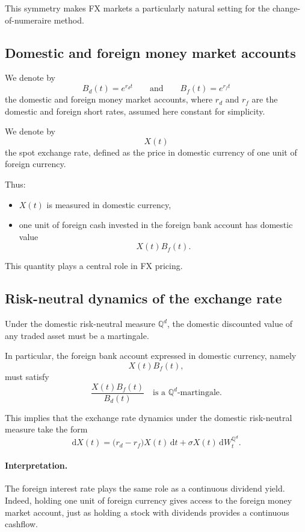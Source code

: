 \documentclass[11pt]{article}
\newcommand{\Qbb}{\mathbb{Q}}
\theoremstyle{definition}
\theoremstyle{plain}
\begin{document}
This symmetry makes FX markets a particularly natural setting for the
change-of-numeraire method.

\subsection{Domestic and foreign money market accounts}

We denote by
\[
B_d(t)=e^{r_d t}
\qquad\text{and}\qquad
B_f(t)=e^{r_f t}
\]
the domestic and foreign money market accounts, where \(r_d\) and \(r_f\)
are the domestic and foreign short rates, assumed here constant for
simplicity.

We denote by
\[
X(t)
\]
the spot exchange rate, defined as the price in domestic currency of one
unit of foreign currency.

Thus:
\begin{itemize}[leftmargin=1.4em]
\item \(X(t)\) is measured in domestic currency,
\item one unit of foreign cash invested in the foreign bank account has
domestic value
\[
X(t)B_f(t).
\]
\end{itemize}

This quantity plays a central role in FX pricing.

\subsection{Risk-neutral dynamics of the exchange rate}

Under the domestic risk-neutral measure \(\Qbb^d\), the domestic
discounted value of any traded asset must be a martingale.

In particular, the foreign bank account expressed in domestic currency,
namely
\[
X(t)B_f(t),
\]
must satisfy
\[
\frac{X(t)B_f(t)}{B_d(t)}
\quad\text{is a }\Qbb^d\text{-martingale.}
\]

This implies that the exchange rate dynamics under the domestic
risk-neutral measure take the form
\[
\boxed{
\mathrm{d}X(t)=\big(r_d-r_f\big)X(t)\,\mathrm{d}t+\sigma X(t)\,\mathrm{d}W_t^{\Qbb^d}.
}
\]

\paragraph{Interpretation.}
The foreign interest rate plays the same role as a continuous dividend
yield.
Indeed, holding one unit of foreign currency gives access to the foreign
money market account, just as holding a stock with dividends provides a
continuous cashflow.
\end{document}

